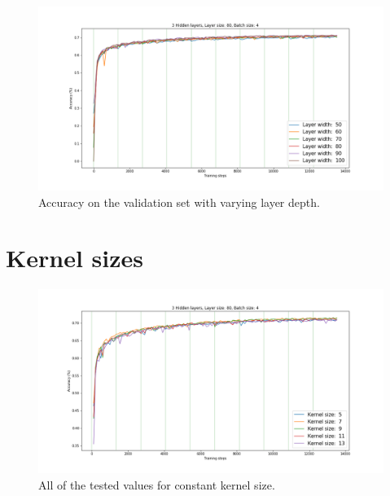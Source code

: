 \begin{figure}[h]
  \centering
  \includegraphics[width=\linewidth]{../graphs/new/layer_width_2}
  \caption{Accuracy on the validation set with varying layer depth.}
\end{figure}

\section*{Kernel sizes}

\begin{figure}[h]
  \centering
  \includegraphics[width=\linewidth]{../graphs/new/kernel_size_1}
  \caption{All of the tested values for constant kernel size.}
\end{figure}